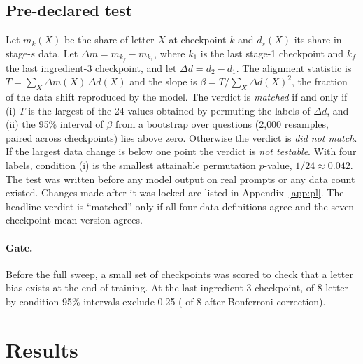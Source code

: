 \documentclass[11pt,a4paper]{article}
\begin{document}
\subsection{Pre-declared test}\label{sec:test}
Let $m_k(X)$ be the share of letter $X$ at checkpoint $k$ and $d_s(X)$ its share in stage-$s$ data. Let $\Delta m = m_{k_f} - m_{k_1}$, where $k_1$ is the last stage-1 checkpoint and $k_f$ the last ingredient-3 checkpoint, and let $\Delta d = d_2 - d_1$. The alignment statistic is $T = \sum_X \Delta m(X)\,\Delta d(X)$ and the slope is $\beta = T / \sum_X \Delta d(X)^2$, the fraction of the data shift reproduced by the model. The verdict is \emph{matched} if and only if (i) $T$ is the largest of the 24 values obtained by permuting the labels of $\Delta d$, and (ii) the 95\% interval of $\beta$ from a bootstrap over questions (2{,}000 resamples, paired across checkpoints) lies above zero. Otherwise the verdict is \emph{did not match}. If the largest data change is below one point the verdict is \emph{not testable}. With four labels, condition (i) is the smallest attainable permutation $p$-value, $1/24 \approx 0.042$. The test was written before any model output on real prompts or any data count existed. Changes made after it was locked are listed in Appendix~\ref{app:pl}. The headline verdict is ``matched'' only if all four data definitions agree and the seven-checkpoint-mean version agrees.

\paragraph{Gate.} Before the full sweep, a small set of checkpoints was scored to check that a letter bias exists at the end of training. At the last ingredient-3 checkpoint, \GateNExcl{} of 8 letter-by-condition 95\% intervals exclude 0.25 (\GateNExclBonf{} of 8 after Bonferroni correction).

\section{Results}
\end{document}
